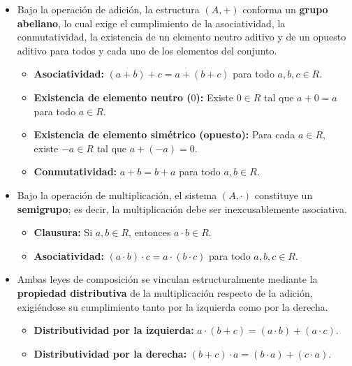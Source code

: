 \documentclass{article}
\begin{document}
\begin{itemize}
    \item Bajo la operación de adición, la estructura $(A, +)$ conforma un \textbf{grupo abeliano}, lo cual exige el cumplimiento de la asociatividad, la conmutatividad, la existencia de un elemento neutro aditivo y de un opuesto aditivo para todos y cada uno de los elementos del conjunto.
    
    \begin{itemize}
        \item \textbf{Asociatividad:} $(a + b) + c = a + (b + c)$ para todo $a, b, c \in R$.
        \item \textbf{Existencia de elemento neutro ($0$):} Existe $0 \in R$ tal que $a + 0 = a$ para todo $a \in R$.
        \item \textbf{Existencia de elemento simétrico (opuesto):} Para cada $a \in R$, existe $-a \in R$ tal que $a + (-a) = 0$.
        \item \textbf{Conmutatividad:} $a + b = b + a$ para todo $a, b \in R$.
    \end{itemize}    
    
    \item Bajo la operación de multiplicación, el sistema $(A, \cdot)$ constituye un \textbf{semigrupo}; es decir, la multiplicación debe ser inexcusablemente asociativa.
    \begin{itemize}
        \item \textbf{Clausura:} Si $a, b \in R$, entonces $a \cdot b \in R$.
        \item \textbf{Asociatividad:} $(a \cdot b) \cdot c = a \cdot (b \cdot c)$ para todo $a, b, c \in R$.
    \end{itemize}

    \item Ambas leyes de composición se vinculan estructuralmente mediante la \textbf{propiedad distributiva} de la multiplicación respecto de la adición, exigiéndose su cumplimiento tanto por la izquierda como por la derecha.    
    \begin{itemize}
        \item \textbf{Distributividad por la izquierda:} $a \cdot (b + c) = (a \cdot b) + (a \cdot c)$.
        \item \textbf{Distributividad por la derecha:} $(b + c) \cdot a = (b \cdot a) + (c \cdot a)$.
    \end{itemize}

\end{itemize}
\end{document}
